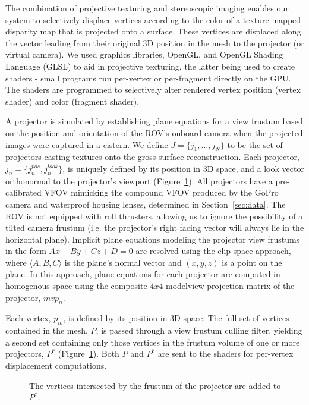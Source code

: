 \documentclass{llncs}
\begin{document}
The combination of projective texturing and stereoscopic imaging enables our system to selectively displace vertices according to the color of a texture-mapped disparity map that is projected onto a surface. These vertices are displaced along the vector leading from their original 3D position in the mesh to the projector (or virtual camera). We used graphics libraries, OpenGL, and OpenGL Shading Language (GLSL) to aid in projective texturing, the latter being used to create shaders - small programs run per-vertex or per-fragment directly on the GPU. The shaders are programmed to selectively alter rendered vertex position (vertex shader) and color (fragment shader).

A projector is simulated by establishing plane equations for a view frustum based on the position and orientation of the ROV's onboard camera when the projected images were captured in a cistern. We define $J = \{j_{1},\dots,j_{N}\}$ to be the set of projectors casting textures onto the gross surface reconstruction. Each projector, $j_{n} = \{j_{n}^{pos}, j_{n}^{look}\}$, is uniquely defined by its position in 3D space, and a look vector orthonormal to the projector's viewport (Figure~\ref{fig:frustum}). All projectors have a pre-calibrated VFOV mimicking the compound VFOV produced by the GoPro camera and waterproof housing lenses, determined in Section~\ref{sec:data}. The ROV is not equipped with roll thrusters, allowing us to ignore the possibility of a tilted camera frustum (i.e. the projector's right facing vector will always lie in the horizontal plane). Implicit plane equations modeling the projector view frustums in the form $Ax + By + Cz + D = 0$ are resolved using the clip space approach, where $\langle A, B, C\rangle$ is the plane's normal vector and  $(x, y, z)$ is a point on the plane. In this approach, plane equations for each projector are computed in homogenous space using the composite $4x4$ modelview projection matrix of the projector, $mvp_n$. 

Each vertex, $p_{m}$, is defined by its position in 3D space. The full set of vertices contained in the mesh, $P$, is passed through a view frustum culling filter, yielding a second set containing only those vertices in the frustum volume of one or more projectors, $P^*$ (Figure~\ref{fig:frustum}). Both $P$ and $P^*$ are sent to the shaders for per-vertex displacement computations.
%
\vspace{-10pt}
\begin{figure}[!h]
   \vspace{-0.2cm}
   \caption{The vertices intersected by the frustum of the projector are added to $P^*$.}
  \label{fig:frustum}
 \end{figure}
%
\vspace{-25pt}
\end{document}
